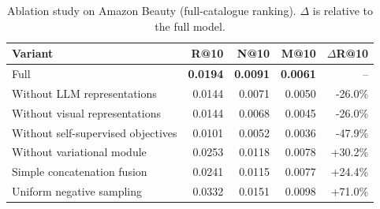 \begin{table}[t]
\centering
\caption{Ablation study on Amazon Beauty (full-catalogue ranking). $\Delta$ is relative to the full model.}
\label{tab:ablation_results}
\small
\begin{tabular}{lrrrr}
\toprule
Variant & R@10 & N@10 & M@10 & $\Delta$R@10 \\
\midrule
Full \model{} & \textbf{0.0194} & \textbf{0.0091} & \textbf{0.0061} & -- \\
Without LLM representations & 0.0144 & 0.0071 & 0.0050 & -26.0\% \\
Without visual representations & 0.0144 & 0.0068 & 0.0045 & -26.0\% \\
Without self-supervised objectives & 0.0101 & 0.0052 & 0.0036 & -47.9\% \\
Without variational module & 0.0253 & 0.0118 & 0.0078 & +30.2\% \\
Simple concatenation fusion & 0.0241 & 0.0115 & 0.0077 & +24.4\% \\
Uniform negative sampling & 0.0332 & 0.0151 & 0.0098 & +71.0\% \\
\bottomrule
\end{tabular}
\end{table}
